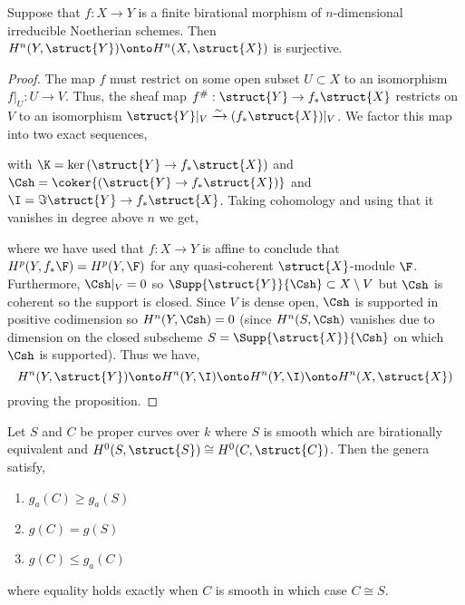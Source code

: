 \begin{lemma}
Suppose that $f : X \to Y$ is a finite birational morphism of $n$-dimensional irreducible Noetherian schemes. Then $H^n(Y, \struct{Y}) \onto H^n(X, \struct{X})$ is surjective.
\end{lemma}

\begin{proof}
The map $f$ must restrict on some open subset $U \subset X$ to an isomorphism $f|_U : U \to V$. Thus, the sheaf map $f^\# : \struct{Y} \to f_* \struct{X}$ restricts on $V$ to an isomorphism $\struct{Y}|_V \xrightarrow{\sim} (f_* \struct{X})|_V$. We factor this map into two exact sequences,
\begin{center}
\end{center}
with $\K = \ker{(\struct{Y} \to f_* \struct{X})}$ and $\Csh = \coker{(\struct{Y} \to f_* \struct{X})}$ and $\I = \Im{\struct{Y} \to f_* \struct{X}}$. Taking cohomology and using that it vanishes in degree above $n$ we get,
\begin{center}
\end{center}
where we have used that $f : X \to Y$ is affine to conclude that $H^p(Y, f_* \F) = H^p(Y, \F)$ for any quasi-coherent $\struct{X}$-module $\F$. Furthermore, $\Csh|_V = 0$ so $\Supp{\struct{Y}}{\Csh} \subset X \setminus V$ but $\Csh$ is coherent so the support is closed. Since $V$ is dense open, $\Csh$ is supported in positive codimension so $H^n(Y, \Csh) = 0$ (since $H^n(S, \Csh)$ vanishes due to dimension on the closed subscheme $S = \Supp{\struct{X}}{\Csh}$ on which $\Csh$ is supported). Thus we have,
\[ H^n(Y, \struct{Y}) \onto H^n(Y, \I) \onto H^n(Y, \I) \onto H^n(X, \struct{X}) \]
proving the proposition.
\end{proof}

\begin{lemma} \label{genus_formulas}
Let $S$ and $C$ be proper curves over $k$ where $S$ is smooth which are birationally equivalent and $H^0(S, \struct{S}) \cong H^0(C, \struct{C})$. Then the genera satisfy,
\begin{enumerate}
\item $g_a(C) \ge g_a(S)$
\item $g(C) = g(S)$
\item $g(C) \le g_a(C)$
\end{enumerate} 
where equality holds exactly when $C$ is smooth in which case $C \cong S$.
\end{lemma}

